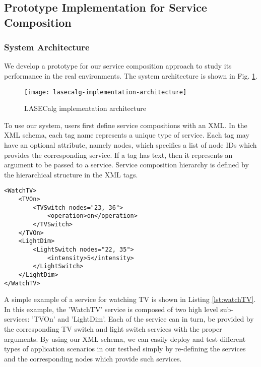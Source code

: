 \subsection{Prototype Implementation for Service Composition}\label{lasecprototype}

\subsubsection{System Architecture}
We develop a prototype for our service composition approach to study its performance in the real environments. The system architecture is shown in Fig. \ref{fig:lasecalg-implementation-architecture}.

\begin{figure}
\centering
\texttt{[image: lasecalg-implementation-architecture]}
\caption{LASECalg implementation architecture}
\label{fig:lasecalg-implementation-architecture}
\end{figure}

To use our system, users first define service compositions with an XML. In the XML schema, each tag name represents a unique type of service. Each tag may have an optional attribute, namely nodes, which specifies a list of node IDs which provides the corresponding service. If a tag has text, then it represents an argument to be passed to a service. Service composition hierarchy is defined by the hierarchical structure in the XML tags.

\begin{lstlisting}[caption=A simple service for switching on TV, label=lst:watchTV]
<WatchTV>
	<TVOn>
		<TVSwitch nodes="23, 36">
			<operation>on</operation>
		</TVSwitch>
	</TVOn>
	<LightDim>
		<LightSwitch nodes="22, 35">
			<intensity>5</intensity>
		</LightSwitch>
	</LightDim>
</WatchTV>
\end{lstlisting}

A simple example of a service for watching TV is shown in Listing \ref{lst:watchTV}. In this example, the 'WatchTV' service is composed of two high level sub-services: 'TVOn' and 'LightDim'. Each of the service can in turn, be provided by the corresponding TV switch and light switch services with the proper arguments. By using our XML schema, we can easily deploy and test different types of application scenarios in our testbed simply by re-defining the services and the corresponding nodes which provide such services.

